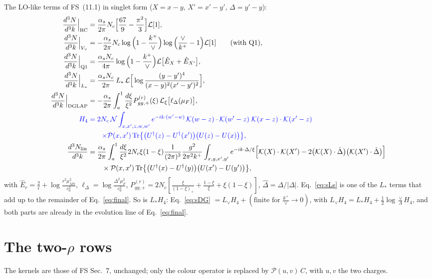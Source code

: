 \documentclass[10pt]{article}
\numberwithin{equation}{section}
\newcommand{\new}[1]{{\color{blue}#1}}
\newcommand{\Lv}{L_{\vee}}
\newcommand{\Ls}{L_{*}}
\newcommand{\KK}{\mathcal K}
\newcommand{\NN}{\mathcal N}
\newcommand{\PP}{\mathcal P}
\newcommand{\LL}{\mathcal L}
\newcommand{\Eh}{\hat E}
\newcommand{\Dh}{\hat\Delta}
\newcommand{\pre}{\frac{1}{(2\pi)^3}}
\newcommand{\phw}{e^{-ik\cdot(w'-w)}}
\begin{document}
The LO-like terms of FS~(11.1) in singlet form ($X=x-y$, $X'=x'-y'$, $\Delta=y'-y$):
\begin{align}
\frac{d^3N}{d^3k}\Big|_{\rm RC}&=\frac{\alpha_s}{2\pi}N_c\Big[\frac{67}{9}-\frac{\pi^2}{3}\Big]\LL[1],\label{eq:sRC}\\
\frac{d^3N}{d^3k}\Big|_{V_\vee}&=-\frac{\alpha_s}{2\pi}N_c\log\Big(1-\frac{k^+}{\vee}\Big)\log\Big(\frac{\vee}{k^+}-1\Big)\LL[1]\qquad\text{(with Q1)},\label{eq:sVv}\\
\frac{d^3N}{d^3k}\Big|_{\rm Q1}&=\frac{\alpha_sN_c}{4\pi}\log\Big(1-\frac{k^+}{\vee}\Big)\LL\big[\Eh_X+\Eh_{X'}\big],\label{eq:sQ1}\\
\frac{d^3N}{d^3k}\Big|_{\Ls}&=\frac{\alpha_sN_c}{2\pi}\,\Ls\,\LL\Big[\log\frac{(y-y')^4}{(x-y)^2(x'-y')^2}\Big],\label{eq:sLs}\\
\frac{d^3N}{d^3k}\Big|_{\rm DGLAP}&=-\frac{\alpha_s}{2\pi}\int_{a}^1\frac{d\xi}{\xi^2}P^{(r)}_{gg,+}(\xi)\,\LL_\xi\big[\ell_\Delta(\mu_F)\big],\label{eq:sDG}\\
\new{H_4}&\new{{}=2N_c\,\NN\int_{x,x',z,w,w'}\phw\,\KK(w-z)\cdot\KK(w'-z)\;\KK(x-z)\cdot\KK(x'-z)}\notag\\
&\qquad\new{\times\PP(x,x')\,{\rm Tr}\big\{\big(U^\dagger(z)-U^\dagger(x')\big)\big(U(z)-U(x)\big)\big\},}\label{eq:sH4}\\
\frac{d^3N_{\rm lin}}{d^3k}&=\frac{\alpha_s}{2\pi}\int_{a}^1\frac{d\xi}{\xi^2}2N_c\xi(1-\xi)\pre\frac{g^2}{2\pi^2k^+}\int_{x,y,x',y'}e^{-ik\cdot\Delta/\xi}\Big[\KK(X)\cdot\KK(X')-2\big(\KK(X)\cdot\Dh\big)\big(\KK(X')\cdot\Dh\big)\Big]\notag\\
&\qquad\times\PP(x,x')\,{\rm Tr}\big\{\big(U^\dagger(x)-U^\dagger(y)\big)\big(U(x')-U(y')\big)\big\},\label{eq:slin}
\end{align}
with $\Eh_r=\frac2\epsilon+\log\frac{r^2\mu^2_{\overline{MS}}}{c_0^2}$, $\ell_\Delta=\log\frac{\Delta^2\mu_F^2}{c_0^2}$, $P^{(r)}_{gg,+}=2N_c[\frac{\xi}{(1-\xi)_+}+\frac{1-\xi}{\xi}+\xi(1-\xi)]$, $\Dh=\Delta/|\Delta|$. Eq.~\eqref{eq:sLs} is one of the $\Ls$ terms that add up to the remainder of Eq.~\eqref{eq:final}. \new{So is $\Ls H_4$: Eq.~\eqref{eq:sDG} $=\Lv H_4+(\text{finite for }\frac{k^+}{\vee}\to0)$, with $\Lv H_4=\Ls H_4+\frac12\log\frac\vee\Lambda H_4$, and both parts are already in the evolution line of Eq.~\eqref{eq:final}.}

\section{The two-\texorpdfstring{$\rho$}{rho} rows}\label{sec:two}
The kernels are those of FS Sec.~7, unchanged; only the colour operator is replaced by $\PP(u,v)\,C$, with $u,v$ the two charges.
\end{document}
